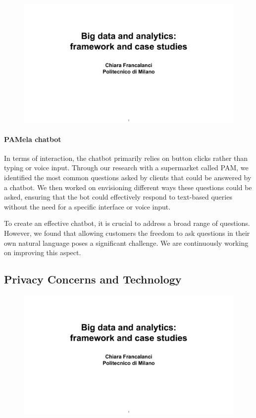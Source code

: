 \begin{figure}[!h]
    \centering
    \includegraphics[page=16, trim = 1.5cm 2cm 1.5cm 3.3cm, clip, width=\textwidth]{images/06 - BIG_DATA.pdf}
\end{figure}

\paragraph{PAMela chatbot}
In terms of interaction, the chatbot primarily relies on button clicks
rather than typing or voice input. Through our research with a
supermarket called PAM, we identified the most common questions asked by
clients that could be answered by a chatbot. We then worked on
envisioning different ways these questions could be asked, ensuring that
the bot could effectively respond to text-based queries without the need
for a specific interface or voice input.

To create an effective chatbot, it is crucial to address a broad range
of questions. However, we found that allowing customers the freedom to
ask questions in their own natural language poses a significant
challenge. We are continuously working on improving this aspect.

\subsection{Privacy Concerns and
    Technology}\label{privacy-concerns-and-technology}


\begin{figure}[!h]
    \centering
    \includegraphics[page=17, trim = 1.5cm 1cm 0.7cm 1cm, clip, width=\textwidth]{images/06 - BIG_DATA.pdf}
\end{figure}

